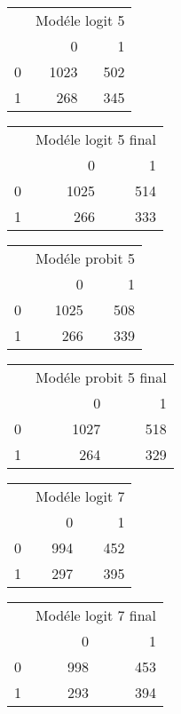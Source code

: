 \documentclass[
  14pt,
  french,
]{article}
\begin{document}
\begin{center}

\begin{tabular}{l|r|r}
\hline
\multicolumn{1}{c|}{ } & \multicolumn{2}{c}{Modéle logit 5 } \\
\cline{2-3}
  & 0 & 1\\
\hline
0 & 1023 & 502\\
\hline
1 & 268 & 345\\
\hline
\end{tabular}


\begin{tabular}{l|r|r}
\hline
\multicolumn{1}{c|}{ } & \multicolumn{2}{c}{Modéle logit 5 final } \\
\cline{2-3}
  & 0 & 1\\
\hline
0 & 1025 & 514\\
\hline
1 & 266 & 333\\
\hline
\end{tabular}


\begin{tabular}{l|r|r}
\hline
\multicolumn{1}{c|}{ } & \multicolumn{2}{c}{Modéle probit 5 } \\
\cline{2-3}
  & 0 & 1\\
\hline
0 & 1025 & 508\\
\hline
1 & 266 & 339\\
\hline
\end{tabular}


\begin{tabular}{l|r|r}
\hline
\multicolumn{1}{c|}{ } & \multicolumn{2}{c}{Modéle probit 5 final } \\
\cline{2-3}
  & 0 & 1\\
\hline
0 & 1027 & 518\\
\hline
1 & 264 & 329\\
\hline
\end{tabular}


\begin{tabular}{l|r|r}
\hline
\multicolumn{1}{c|}{ } & \multicolumn{2}{c}{Modéle logit 7 } \\
\cline{2-3}
  & 0 & 1\\
\hline
0 & 994 & 452\\
\hline
1 & 297 & 395\\
\hline
\end{tabular}


\begin{tabular}{l|r|r}
\hline
\multicolumn{1}{c|}{ } & \multicolumn{2}{c}{Modéle logit 7 final } \\
\cline{2-3}
  & 0 & 1\\
\hline
0 & 998 & 453\\
\hline
1 & 293 & 394\\
\hline
\end{tabular}



\end{center}
\end{document}
